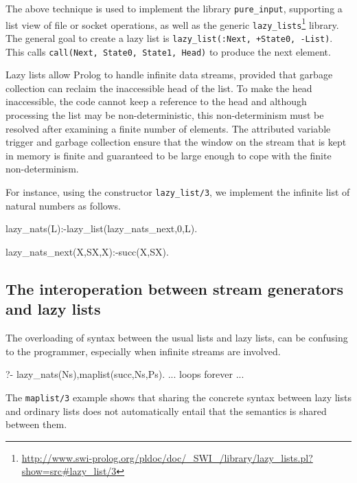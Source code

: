\documentclass{new_tlp}
\begin{document}
The above technique is used to implement the library \texttt{pure\_input}, supporting a list view of file or socket operations, 
as well as the generic
\texttt{lazy\_lists}\footnote{\url{http://www.swi-prolog.org/pldoc/doc/_SWI_/library/lazy_lists.pl?show=src#lazy_list/3}}
library. The general goal to create a lazy list is
\texttt{lazy\_list(:Next, +State0, -List)}. This calls
\texttt{call(Next, State0, State1, Head)} to produce the next element.

Lazy lists allow Prolog to handle infinite data streams, provided that garbage
collection can reclaim the inaccessible head of the list. To make the
head inaccessible, the code cannot keep a reference to the head
and although processing the list may be non-deterministic,
this non-determinism must be resolved after examining a finite number of
elements.  The attributed variable trigger and garbage collection ensure
that the window on the stream that is kept in memory is finite and
guaranteed to be large enough to cope with the finite non-determinism.


For instance, 
using the constructor  {\tt lazy\_list/3}, we implement the infinite list of
natural numbers as follows.
\begin{code}
lazy_nats(L):-lazy_list(lazy_nats_next,0,L).

lazy_nats_next(X,SX,X):-succ(X,SX).
\end{code}


\subsection{The interoperation between stream generators and lazy lists}

The overloading of syntax between the usual lists and lazy lists, 
can be confusing to the
programmer, especially when infinite streams are involved.

\BX
\begin{codex}
?- lazy_nats(Ns),maplist(succ,Ns,Ps).
... loops forever ...
\end{codex}
\EX
The {\tt maplist/3} example
 shows that sharing the concrete syntax between lazy lists and  ordinary lists
does not automatically entail that the semantics is shared between them.
\end{document}
